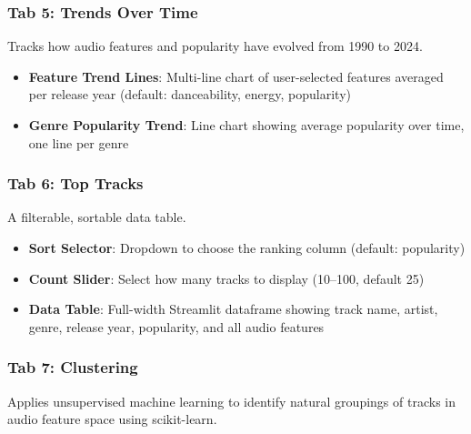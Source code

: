 \documentclass[12pt,a4paper]{article}
\begin{document}
\subsubsection{Tab 5: Trends Over Time}

Tracks how audio features and popularity have evolved from 1990 to 2024.

\begin{itemize}[noitemsep]
    \item \textbf{Feature Trend Lines}: Multi-line chart of user-selected features averaged per release year (default: danceability, energy, popularity)
    \item \textbf{Genre Popularity Trend}: Line chart showing average popularity over time, one line per genre
\end{itemize}

\subsubsection{Tab 6: Top Tracks}

A filterable, sortable data table.

\begin{itemize}[noitemsep]
    \item \textbf{Sort Selector}: Dropdown to choose the ranking column (default: popularity)
    \item \textbf{Count Slider}: Select how many tracks to display (10--100, default 25)
    \item \textbf{Data Table}: Full-width Streamlit dataframe showing track name, artist, genre, release year, popularity, and all audio features
\end{itemize}

\subsubsection{Tab 7: Clustering}

Applies unsupervised machine learning to identify natural groupings of tracks in audio feature space using scikit-learn.
\end{document}

